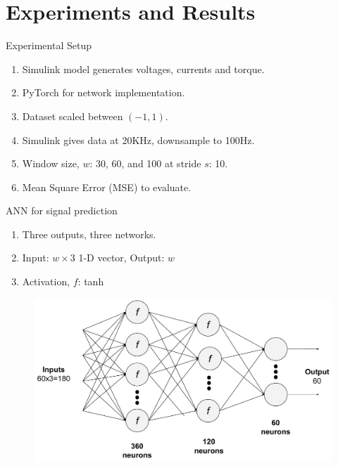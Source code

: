 \documentclass[handout]{beamer}
\begin{document}
\section{Experiments and Results}
\begin{frame}{Experimental Setup}
  \begin{enumerate}
    \item Simulink model generates voltages, currents and torque.
    \item PyTorch for network implementation.
    \item Dataset scaled between $(-1,1)$.
    \item Simulink gives data at 20KHz, downsample to 100Hz.
    \item Window size, $w$: 30, 60, and 100 at stride $s$: 10.
    \item Mean Square Error (MSE) to evaluate.
  \end{enumerate}
\end{frame}

\begin{frame}{ANN for signal prediction}
  \begin{enumerate}
    \item Three outputs, three networks.
    \item Input: $w\times3$ 1-D vector, Output: $w$
    \item Activation, $f$: tanh
  \end{enumerate}
  \begin{center}
    \begin{figure}
    \includegraphics[scale=0.35]{images/motor_ann}
    \end{figure}
  \end{center}
\end{frame}
\end{document}
